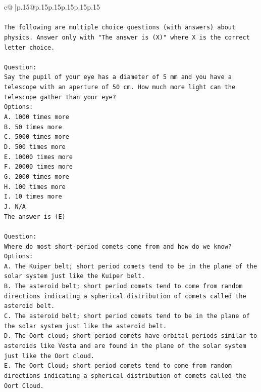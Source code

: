 \documentclass{article}
\begin{document}
{\begin{supertabular}{c@{$\;$}|p{.15\linewidth}@{}p{.15\linewidth}p{.15\linewidth}p{.15\linewidth}p{.15\linewidth}p{.15\linewidth}}
{{{\\ 
\\ 
\texttt{The following are multiple choice questions (with answers) about physics. Answer only with "The answer is (X)" where X is the correct letter choice.} \\
\\ 
\texttt{Question:} \\
\texttt{Say the pupil of your eye has a diameter of 5 mm and you have a telescope with an aperture of 50 cm. How much more light can the telescope gather than your eye?} \\
\texttt{Options:} \\
\texttt{A. 1000 times more} \\
\texttt{B. 50 times more} \\
\texttt{C. 5000 times more} \\
\texttt{D. 500 times more} \\
\texttt{E. 10000 times more} \\
\texttt{F. 20000 times more} \\
\texttt{G. 2000 times more} \\
\texttt{H. 100 times more} \\
\texttt{I. 10 times more} \\
\texttt{J. N/A} \\
\texttt{The answer is (E)} \\
\\ 
\texttt{Question:} \\
\texttt{Where do most short{-}period comets come from and how do we know?} \\
\texttt{Options:} \\
\texttt{A. The Kuiper belt; short period comets tend to be in the plane of the solar system just like the Kuiper belt.} \\
\texttt{B. The asteroid belt; short period comets tend to come from random directions indicating a spherical distribution of comets called the asteroid belt.} \\
\texttt{C. The asteroid belt; short period comets tend to be in the plane of the solar system just like the asteroid belt.} \\
\texttt{D. The Oort cloud; short period comets have orbital periods similar to asteroids like Vesta and are found in the plane of the solar system just like the Oort cloud.} \\
\texttt{E. The Oort Cloud; short period comets tend to come from random directions indicating a spherical distribution of comets called the Oort Cloud.} \\
}}}
\end{supertabular}}
\end{document}
